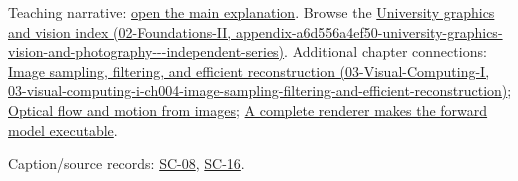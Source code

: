 Teaching narrative: \hyperref[04-visual-computing-ii-ch031-sequence-models-and-attention]{open the main explanation}. Browse the \href{../02-Foundations-II/main.pdf\#nameddest=appendix-a6d556a4ef50-university-graphics-vision-and-photography---independent-series}{University graphics and vision index (02-Foundations-II, appendix-a6d556a4ef50-university-graphics-vision-and-photography-\/-\/-independent-series)}. Additional chapter connections: \href{../03-Visual-Computing-I/main.pdf\#nameddest=03-visual-computing-i-ch004-image-sampling-filtering-and-efficient-reconstruction}{Image sampling, filtering, and efficient reconstruction (03-Visual-Computing-I, 03-visual-computing-i-ch004-image-sampling-filtering-and-efficient-reconstruction)}; \hyperref[04-visual-computing-ii-ch030-optical-flow-and-motion-from-images]{Optical flow and motion from images}; \hyperref[04-visual-computing-ii-ch035-a-complete-renderer-makes-the-forward-model-executable]{A complete renderer makes the forward model executable}.

Caption/source records: \hyperref[04-visual-computing-ii-ch036-sc-08---stanford-cs231n-spring-2025-lecture-8-attention-and-transformers]{SC-08}, \hyperref[04-visual-computing-ii-ch036-sc-16---stanford-cs231n-deep-learning-for-computer-vision-spring-2025-lecture-16-vision-and-language]{SC-16}.
